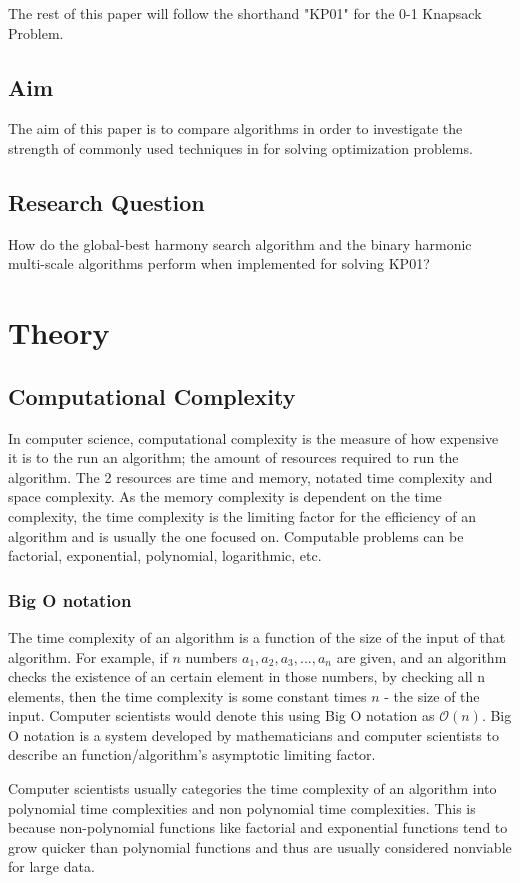 \documentclass[titlepage]{article}
\begin{document}
The rest of this paper will follow the shorthand "KP01" for the 0-1 Knapsack Problem. 

\subsection{Aim}
The aim of this paper is to compare algorithms in order to investigate the strength of commonly used techniques in for solving optimization problems.

\subsection{Research Question}
How do the global-best harmony search algorithm and the binary harmonic multi-scale algorithms perform when implemented for solving KP01?

\section{Theory}
\subsection{Computational Complexity}
In computer science, computational complexity is the measure of how expensive it is to the run an algorithm; the amount of resources required to run the algorithm. The 2 resources are time and memory, notated time complexity and space complexity. As the memory complexity is dependent on the time complexity, the time complexity is the limiting factor for the efficiency of an algorithm and is usually the one focused on. Computable problems can be factorial, exponential, polynomial, logarithmic, etc.

\subsubsection*{Big O notation}
The time complexity of an algorithm is a function of the size of the input of that algorithm. For example, if $n$ numbers $a_1, a_2, a_3, ..., a_n$ are given, and an algorithm checks the existence of an certain element in those numbers, by checking all n elements, then the time complexity is some constant times $n$ - the size of the input. Computer scientists would denote this using Big O notation as $\mathcal{O}(n)$. Big O notation is a system developed by mathematicians and computer scientists to describe an function/algorithm's asymptotic limiting factor.

Computer scientists usually categories the time complexity of an algorithm into polynomial time complexities and non polynomial time complexities. This is because non-polynomial functions like factorial and exponential functions tend to grow quicker than polynomial functions and thus are usually considered nonviable for large data. 
\end{document}
